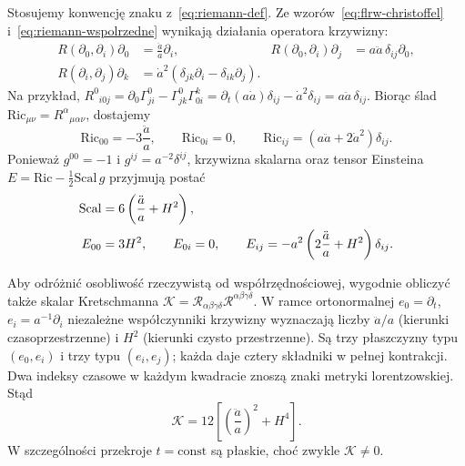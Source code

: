 \begin{przyklad}
\label{prz:flrw-krzywizna}
Stosujemy konwencję znaku z~\eqref{eq:riemann-def}.
Ze wzorów~\eqref{eq:flrw-christoffel}
i~\eqref{eq:riemann-wspolrzedne} wynikają działania
operatora krzywizny:
\begin{align*}
 R(\partial_0,\partial_i)\partial_0
   &=\frac{\ddot a}{a}\partial_i, &
 R(\partial_0,\partial_i)\partial_j
   &=a\ddot a\,\delta_{ij}\partial_0,\\
 R(\partial_i,\partial_j)\partial_k
   &=\dot a^2(\delta_{jk}\partial_i-\delta_{ik}\partial_j).
\end{align*}
Na przykład,
$R^0{}_{i0j}=\partial_0\Gamma^0_{ji}
-\Gamma^0_{jk}\Gamma^k_{0i}
=\partial_t(a\dot a)\delta_{ij}-\dot a^2\delta_{ij}
=a\ddot a\,\delta_{ij}$.
Biorąc ślad $\mathrm{Ric}_{\mu\nu}=R^\alpha{}_{\mu\alpha\nu}$,
dostajemy
\begin{equation}\label{eq:flrw-ricci}
 \mathrm{Ric}_{00}=-3\frac{\ddot a}{a},\qquad
 \mathrm{Ric}_{0i}=0,\qquad
 \mathrm{Ric}_{ij}=(a\ddot a+2\dot a^2)\delta_{ij}.
\end{equation}
Ponieważ $g^{00}=-1$ i $g^{ij}=a^{-2}\delta^{ij}$,
krzywizna skalarna oraz tensor Einsteina
$E=\mathrm{Ric}-\tfrac12\mathrm{Scal}\,g$ przyjmują postać
\begin{align}\label{eq:flrw-scalar-einstein}
 \mathrm{Scal}
  &=6\left(\frac{\ddot a}{a}+H^2\right),\notag\\
 E_{00}&=3H^2,\qquad E_{0i}=0,\qquad
 E_{ij}=-a^2\left(2\frac{\ddot a}{a}+H^2\right)\delta_{ij}.
\end{align}

Aby odróżnić osobliwość rzeczywistą od współrzędnościowej,
wygodnie obliczyć także skalar Kretschmanna
$\mathcal K=\mathcal R_{\alpha\beta\gamma\delta}
\mathcal R^{\alpha\beta\gamma\delta}$.
W ramce ortonormalnej $e_0=\partial_t$, $e_i=a^{-1}\partial_i$
niezależne współczynniki krzywizny wyznaczają liczby
$\ddot a/a$ (kierunki czasoprzestrzenne) i $H^2$
(kierunki czysto przestrzenne).
Są trzy płaszczyzny typu $(e_0,e_i)$
i trzy typu $(e_i,e_j)$; każda daje cztery
składniki w pełnej kontrakcji. Dwa indeksy
czasowe w każdym kwadracie znoszą znaki
metryki lorentzowskiej. Stąd
\begin{equation}\label{eq:flrw-kretschmann}
 \mathcal K=12\left[\left(\frac{\ddot a}{a}\right)^2+H^4\right].
\end{equation}
W szczególności przekroje $t=\mathrm{const}$ są płaskie,
choć zwykle $\mathcal K\ne0$.
\end{przyklad}

